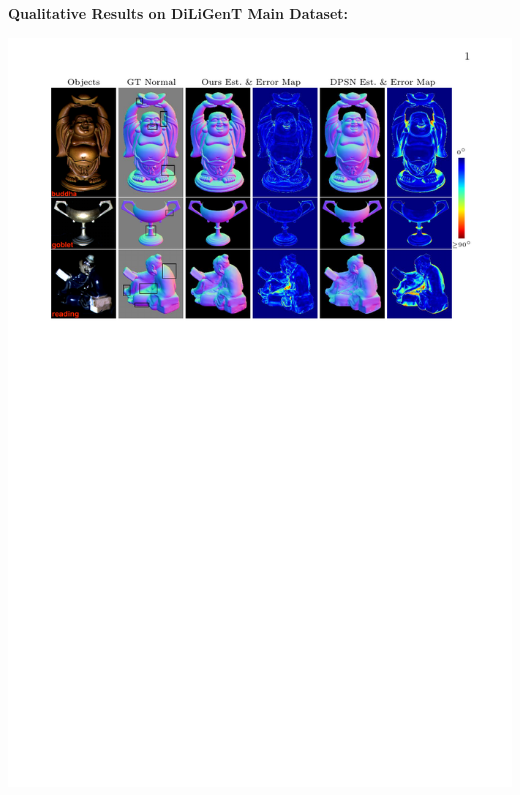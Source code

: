 {    \hfill
    \begin{minipage}[t]{0.465\textwidth}
    \textbf{\color{sufered}Qualitative Results on DiLiGenT Main Dataset:} 
        \begin{center}
            \vspace{-0.5em}
            \includegraphics[width=\textwidth]{images/res_qual_diligent_main}
        \end{center}
    \end{minipage}

}
